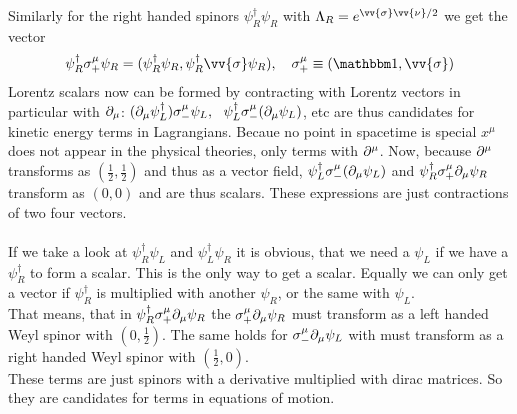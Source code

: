 Similarly for the right handed spinors $\psi_R^\dagger \psi_R$ with $\Lambda_R = e^{\vv{\sigma}\vv{\nu}/2}$ we get the vector
\[ \psi_R^\dagger \sigma_+^\mu \psi_R = ( \psi_R^\dagger \psi_R, \psi_R^\dagger \vv{\sigma} \psi_R), ~~~ \sigma_+^\mu \equiv (\ehm, \vv{\sigma})\]
Lorentz scalars now can be formed by contracting with Lorentz vectors in particular with $\partial_\mu$: $( \partial_\mu \psi_L^\dagger) \sigma_-^\mu \psi_L,~~ \psi_L^\dagger \sigma_-^\mu ( \partial_\mu \psi_L) $, etc are thus candidates for kinetic energy terms in Lagrangians. Becaue no point in spacetime is special $x^\mu$ does not appear in the physical theories, only terms with $\partial^\mu$. Now, because $\partial^\mu$ transforms as $\left(\frac{1}{2}, \frac{1}{2}\right)$ and thus as a vector field, $\psi^\dagger_L \sigma_-^\mu ( \partial_\mu\psi_L)$ and $\psi_R^\dagger \sigma_+^\mu \partial_\mu \psi_R$ transform as $(0,0)$ and are thus scalars. These expressions are just contractions of two four vectors.\\
\\
If we take a look at $\psi_R^\dagger\psi_L$ and $\psi^\dagger_L\psi_R$ it is obvious, that we need a $\psi_L$ if we have a $\psi_R^\dagger$ to form a scalar. This is the only way to get a scalar. Equally we can only get a vector if $\psi_R^\dagger$ is multiplied with another $\psi_R$, or the same with $\psi_L$.\\
That means, that in $\psi^\dagger_R \sigma_+^\mu \partial_\mu \psi_R$ the $\sigma_+^\mu\partial_\mu \psi_R$ must transform as a left handed Weyl spinor with $\left( 0,\frac{1}{2}\right)$. The same holds for $\sigma_-^\mu\partial_\mu\psi_L$ with must transform as a right handed Weyl spinor with $\left( \frac{1}{2},0\right)$.\\
These terms are just spinors with a derivative multiplied with dirac matrices. So they are candidates for terms in equations of motion.


